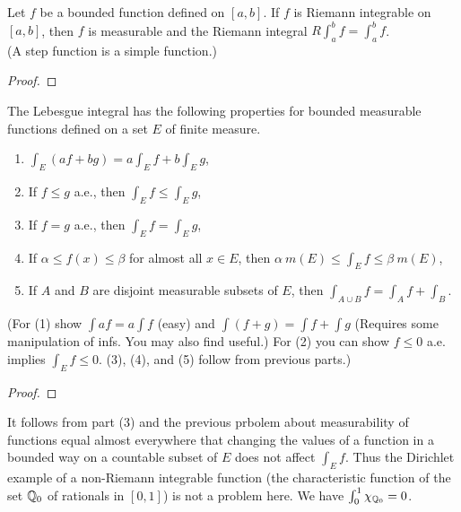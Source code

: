 \begin{pblm}%
	Let $f$ be a bounded function defined on $[a,b]$. If $f$ is Riemann integrable 
	on $[a,b]$, then $f$ is measurable and the Riemann integral $R\int_a^b f =\int_a^b f$. \\
	(A step function is a simple function.)
\begin{proof}
\end{proof}
\end{pblm}

\begin{pblm}\label{p:lebesguelotsofuseful}%
	The Lebesgue integral has the following properties for bounded measurable functions defined 
	on a set $E$ of finite measure. 
	\begin{enumerate}
	\item $\int_E (af + bg) = a\int_E f + b\int_E g$, 
	\item If $f \le g$ a.e., then $\int_E f \le \int_E g$, 
	\item If $f = g$ a.e., then $\int_E f = \int_E g$, 
	\item If $\alpha \le f(x) \le \beta$ for almost all $x \in E$, then 
		$\alpha ~m(E) \le \int_E f \le \beta~ m(E)$, 
	\item If $A$ and $B$ are disjoint measurable subsets of $E$, then 
		$\int_{A\cup B} f = \int_A f + \int_B$. 
	\end{enumerate}
	{\scriptsize{(For (1) show $\int af = a\int f$ (easy) and $\int(f+g) = \int f + \int g$ (Requires some 
	manipulation of infs. You may also find  useful.) For (2) you can 
	show $f \le 0$ a.e. implies $\int_E f \le 0.$ (3), (4), and (5) follow from previous parts.)}}
\begin{proof}
\end{proof}
\end{pblm}

\begin{rmk}%
	It follows from part (3) and the previous prbolem about measurability of functions equal 
	almost everywhere that changing the values of a function in a bounded way on a countable 
	subset of $E$ does not affect $\int_E f$. Thus the Dirichlet example of a non-Riemann 
	integrable function (the characteristic function of the set $\mathbb{Q}_0$ of rationals in $[0,1]$) 
	is not a problem here. We have $\int_0^1 \chi_{\mathbb{Q}_0} = 0$. 
\end{rmk}

